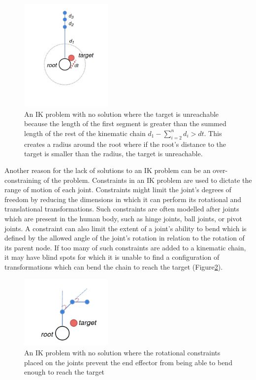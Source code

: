 \begin{figure}
    \centering
    \captionsetup{justification=centering}
    \includegraphics[width=0.4\textwidth]{grafika/unreachable_dist_2.png}
    \caption{An IK problem with no solution where the target is unreachable
    because the length of the first segment is greater than the summed length of
    the rest of the kinematic chain \(d_1 - \sum_{i=2}^{n}d_i > dt\). This creates
    a radius around the root where if the root's distance to the target is
    smaller than the radius, the target is unreachable.
} \label{fig:unreachable_dist2}
\end{figure}

Another reason for the lack of solutions to an IK problem can be an
over-constraining of the problem. Constraints in an IK problem are used to
dictate the range of motion of each joint. Constraints might limit the joint's degrees of
freedom by reducing the dimensions in which it can perform its rotational and
translational transformations. Such constraints are often modelled after joints
which are present in the human body, such as hinge joints, ball joints, or pivot
joints. A constraint can also limit the extent of a joint's ability to bend
which is defined by the allowed angle of the joint's rotation in relation to the
rotation of its parent node. If too many of such constraints are added to
a kinematic chain, it may have blind spots for which it is unable to find
a configuration of transformations which can bend the chain to reach the target
(Figure\ref{fig:unreachable_angles}).

\begin{figure}
    \centering
    \captionsetup{justification=centering}
    \includegraphics[width=0.4\textwidth]{grafika/unreachable_angles.png}
    \caption{An IK problem with no solution where the rotational constraints
    placed on the joints prevent the end effector from being able to bend enough
    to reach the target}
    \label{fig:unreachable_angles}
\end{figure}

